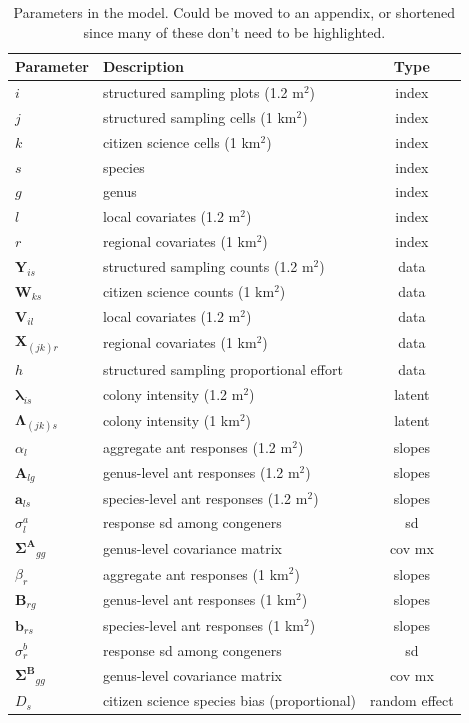 \documentclass[preprint,review,times,12pt,3p]{elsarticle}
\begin{document}
\begin{table}[ht]
	\centering
	\begin{tabular}{ l l c }
		\hline
		\textbf{Parameter} & \textbf{Description} & \textbf{Type} \\
		\hline
		$i$ & structured sampling plots (1.2 m$^2$) & index \\
		$j$ & structured sampling cells (1 km$^2$) & index \\
		$k$ & citizen science cells (1 km$^2$) & index \\
		$s$ & species & index \\
		$g$ & genus & index \\
		$l$ & local covariates (1.2 m$^2$) & index \\
		$r$ & regional covariates (1 km$^2$) & index \\
		\hline
		$\mathbf{Y}_{is}$ & structured sampling counts (1.2 m$^2$) & data \\
		$\mathbf{W}_{ks}$ & citizen science counts (1 km$^2$) & data \\
		$\mathbf{V}_{il}$ & local covariates (1.2 m$^2$) & data \\
		$\mathbf{X}_{(jk)r}$ & regional covariates (1 km$^2$) & data \\
		$h$ & structured sampling proportional effort & data \\
		\hline
		$\mathbf{\lambda}_{is}$ & colony intensity (1.2 m$^2$) & latent \\
		$\mathbf{\Lambda}_{(jk)s}$ & colony intensity (1 km$^2$) & latent \\
		\hline
		$\alpha_{l}$ & aggregate ant responses (1.2 m$^2$) & slopes \\
		$\mathbf{A}_{lg}$ & genus-level ant responses (1.2 m$^2$) & slopes \\
		$\mathbf{a}_{ls}$ & species-level ant responses (1.2 m$^2$) & slopes \\
		$\sigma^a_{l}$ & response sd among congeners & sd \\
		$\mathbf{\Sigma^A}_{gg}$ & genus-level covariance matrix & cov mx \\
		$\beta_{r}$ & aggregate ant responses (1 km$^2$) & slopes \\
		$\mathbf{B}_{rg}$ & genus-level ant responses (1 km$^2$) & slopes \\
		$\mathbf{b}_{rs}$ & species-level ant responses (1 km$^2$) & slopes \\
		$\sigma^b_{r}$ & response sd among congeners & sd \\
		$\mathbf{\Sigma^B}_{gg}$ & genus-level covariance matrix & cov mx \\
		$D_{s}$ & citizen science species bias (proportional) & random effect \\
	\end{tabular}
	\caption{\label{table:params} Parameters in the model. Could be moved to an appendix, or shortened since many of these don't need to be highlighted. }
\end{table}
\end{document}
